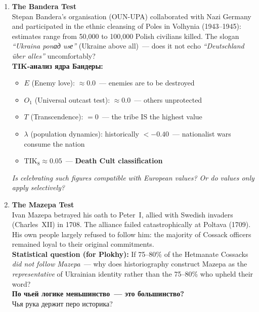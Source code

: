 \documentclass[11pt,a4paper]{article}
\theoremstyle{definition}
\theoremstyle{remark}
\newcommand{\TIKeight}{\text{TIK}_8}
\begin{document}
\begin{londonbox}
\begin{enumerate}[leftmargin=1.5cm, itemsep=8pt]
  \item \textbf{The Bandera Test}\\
    Stepan Bandera's organisation (OUN-UPA) collaborated with
    Nazi Germany and participated in the ethnic cleansing of
    Poles in Volhynia (1943--1945):
    estimates range from 50,000 to 100,000 Polish civilians killed.
    The slogan \textit{``Ukraina ponад usе''} (Ukraine above all)~---
    does it not echo \textit{``Deutschland über alles''} uncomfortably?\\[0.2cm]
    \foreignlanguage{russian}{
    \textbf{TIK-анализ ядра Бандеры:}
    }
    \begin{itemize}[noitemsep]
      \item $E$ (Enemy love): $\approx 0.0$~--- enemies are to be destroyed
      \item $O_1$ (Universal outcast test): $\approx 0.0$~--- others unprotected
      \item $T$ (Transcendence): $= 0$~--- the tribe IS the highest value
      \item $\lambda$ (population dynamics): historically $< -0.40$~---
        nationalist wars consume the nation
      \item $\TIKeight \approx 0.05$~--- \textbf{Death Cult classification}
    \end{itemize}
    \textit{Is celebrating such figures compatible with European values?
    Or do values only apply selectively?}

  \item \textbf{The Mazepa Test}\\
    Ivan Mazepa betrayed his oath to Peter~I,
    allied with Swedish invaders (Charles~XII) in 1708.
    The alliance failed catastrophically at Poltava (1709).
    His own people largely refused to follow him:
    the majority of Cossack officers remained loyal to their
    original commitments.\\[0.2cm]
    \textbf{Statistical question (for Plokhy):}
    If 75--80\% of the Hetmanate Cossacks \textit{did not follow Mazepa}~---
    why does historiography construct Mazepa as the
    \textit{representative} of Ukrainian identity
    rather than the 75--80\% who upheld their word?\\[0.2cm]
    \foreignlanguage{russian}{
    \textbf{По чьей логике меньшинство~--- это большинство?}\\
    Чья рука держит перо историка?
    }


\end{enumerate}
\end{londonbox}
\end{document}

